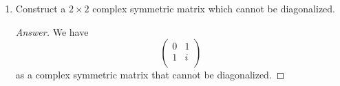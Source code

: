 \documentclass[../psets.tex]{subfiles}
\begin{document}
\begin{enumerate}[label={\textbf{2.\arabic*.}}]
\begin{enumerate}
\begin{proof}[Answer]
\begin{align*}
                \x_2 &=
                \begin{pmatrix}
                    1\\
                    2i\\
                \end{pmatrix}
            \end{align*}
            For the corresponding eigenvalues, it is easy to see that 3 and $-3$ nicely fit the bill, yielding
            \begin{equation*}
                A =
                \begin{pmatrix}
                    2 & 1\\
                    i & 2i\\
                \end{pmatrix}
                \begin{pmatrix}
                    3 & 0\\
                    0 & -3\\
                \end{pmatrix}
                \begin{pmatrix}
                    2 & 1\\
                    i & 2i\\
                \end{pmatrix}^{-1}
                =
                \begin{pmatrix}
                    5 & 4i\\
                    4i & -5\\
                \end{pmatrix}
            \end{equation*}
            as our final diagonalizable $2\times 2$ complex symmetric matrix that does not admit an orthogonal basis of eigenvectors.
        \end{proof}
        \item Construct a $2\times 2$ complex symmetric matrix which cannot be diagonalized.
        \begin{proof}[Answer]
            We have
            \begin{equation*}
                \begin{pmatrix}
                    0 & 1\\
                    1 & i\\
                \end{pmatrix}
            \end{equation*}
            as a complex symmetric matrix that cannot be diagonalized.
        \end{proof}
    \end{enumerate}
\end{enumerate}
\end{document}

